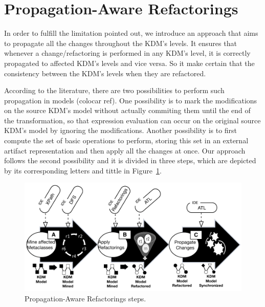 
\section{Propagation-Aware Refactorings} %
\label{sec:the_approach}

In order to fulfill the limitation pointed out, we introduce an approach that aims to propagate all the changes throughout the KDM's levels. It ensures that whenever a change/refactoring is performed in any KDM's level, it is correctly propagated to affected KDM's levels and vice versa. So it make certain that the consistency between the KDM's levels when they are refactored. 

According to the literature, there are two possibilities to perform such propagation in models (colocar ref). One possibility
is to mark the modifications on the source KDM's model without actually commiting them until the end of
the transformation, so that expression evaluation can occur on the original source KDM's model by ignoring
the modifications. Another possibility is to first compute the set of basic operations to perform,
storing this set in an external artifact representation and then apply all the changes at once. Our
approach follows the second possibility and it is divided in three steps, which are depicted by its corresponding letters and tittle in Figure~\ref{fig:approach}.


\begin{figure}[h]
	\centering
	\includegraphics[scale=0.56]{figuras/allStepApproachKDMPropagation}
	\caption{Propagation-Aware Refactorings steps.}
	\label{fig:approach}
\end{figure}

